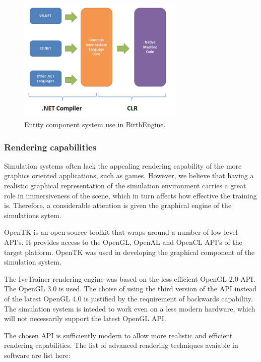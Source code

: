   \begin{figure}
  \begin{center}
  \includegraphics[width=80mm]{sections/methodology/images/software/dotnet-runtime.png}
  \caption[Entity component system use in BirthEngine.]{\label{software-dotnet-runtime} Entity component system use in BirthEngine.}
  \end{center}
  \end{figure}

\subsubsection{Rendering capabilities}

  Simulation systems often lack the appealing rendering capability of the more graphics oriented applications, such as games. However, we believe that having a realistic graphical representation of the simulation environment carries a great role in immersiveness of the scene, which in turn affects how effective the training is. Therefore, a considerable attention is given the graphical engine of the simulations sytem.

  OpenTK \citep{opentk} is an open-source toolkit that wraps around a number of low level API's. It provides access to the OpenGL, OpenAL and OpenCL API's of the target platform. OpenTK was used in developing the graphical component of the simulation system.

  The IveTrainer rendering engine was based on the less efficient OpenGL 2.0 API. The OpenGL 3.0 is used. The choise of using the third version of the API instead of the latest OpenGL 4.0 is justified by the requirement of backwards capability. The simulation system is inteded to work even on a less modern hardware, which will not necessarily support the latest OpenGL API.

  The chosen API is sufficiently modern to allow more realistic and efficient rendering capabilities. The list of advanced rendering techniques avaiable in software are list here:

